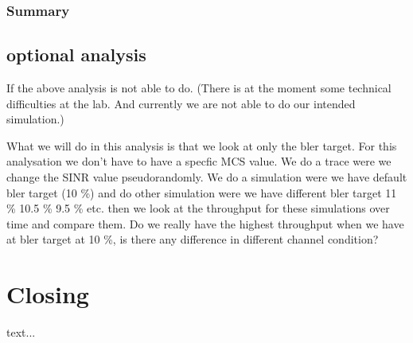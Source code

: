 \documentclass[cropmarks, frame, english]{idamasterthesis}
\begin{document}
\subsection{Summary}

\section{optional analysis}
If the above analysis is not able to do. (There is at the moment some technical difficulties at the lab. And currently we are not able to do our intended simulation.)

What we will do in this analysis is that we look at only the bler target. For this analysation we don't have to have a specfic MCS value. We do a trace were we change the SINR value pseudorandomly. We do a simulation were we have default bler target (10 \%) and do other simulation were we have different bler target 11 \% 10.5 \% 9.5 \% etc. then we look at the throughput for these simulations over time and compare them. Do we really have the highest throughput when we have at bler target at 10 \%, is there any difference in different channel condition?


\chapter{Closing}

text...
\end{document}
